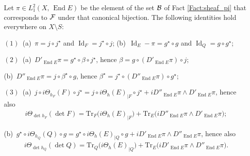 \documentclass[12pt]{article}
\begin{document}
\begin{Cor}\label{Cor:pi_j_g_curvature} Let $\pi\in L^2_1(X,\,\operatorname{End}E)$ be the element of the set ${\cal B}$ of Fact \ref{Fact:sheaf_pi} that corresponds to ${\cal F}$ under that canonical bijection. The following identities hold everywhere on $X\setminus S$:

\vspace{1ex}

$(1)$\, (a)\, $\pi = j\circ j^\star$ \hspace{2ex} and \hspace{2ex} $\operatorname{Id}_F = j^\star\circ j$; \hspace{6ex} (b)\, $\operatorname{Id}_E - \pi = g^\star\circ g$ \hspace{2ex} and \hspace{2ex} $\operatorname{Id}_Q = g\circ g^\star$;

\vspace{1ex}

$(2)$\,  (a)\, $D'_{\operatorname{End}E}\pi = g^\star\circ\beta\circ j^\star$, \hspace{2ex} hence \hspace{2ex} $\beta = g\circ(D'_{\operatorname{End}E}\pi)\circ j$;

\vspace{1ex}

\hspace{3ex} (b)\, $D''_{\operatorname{End}E}\pi = j\circ\beta^\star\circ g$, \hspace{2ex} hence \hspace{2ex} $\beta^\star = j^\star\circ(D''_{\operatorname{End}E}\pi)\circ g^\star$;


\vspace{1ex}

$(3)$\, (a)\, $j\circ i\Theta_{h_F}(F)\circ j^\star = j\circ i\Theta_h(E)_{|F}\circ j^\star + iD''_{\operatorname{End}E}\pi\wedge D'_{\operatorname{End}E}\pi$, hence also \begin{eqnarray*}i\Theta_{\det h_F}(\det F) = \mbox{Tr}_F\bigg(i\Theta_h(E)_{|F}\bigg) + \mbox{Tr}_E\bigg(iD''_{\operatorname{End}E}\pi\wedge D'_{\operatorname{End}E}\pi\bigg);\end{eqnarray*}  

 \vspace{1ex}

\hspace{3ex} (b)\, $g^\star\circ i\Theta_{h_Q}(Q)\circ g = g^\star\circ i\Theta_h(E)_{|Q}\circ g + iD'_{\operatorname{End}E}\pi\wedge D''_{\operatorname{End}E}\pi$, hence also \begin{eqnarray*}i\Theta_{\det h_Q}(\det Q) = \mbox{Tr}_Q\bigg(i\Theta_h(E)_{|Q}\bigg) + \mbox{Tr}_E\bigg(iD'_{\operatorname{End}E}\pi\wedge D''_{\operatorname{End}E}\pi\bigg).\end{eqnarray*}  


\end{Cor}
  
\end{document}
